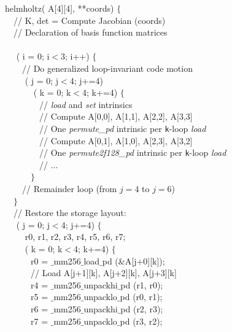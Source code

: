 \begin{algorithm}
\tiny\ttfamily
{}

\begin{multicols}{2}
 helmholtz( A[4][4],  **coords) $\lbrace$\\
~~// K, det = Compute Jacobian (coords) \\
~~// Declaration of basis function matrices \\
~~\\
~~ ( i = 0; i$<$3; i++) $\lbrace$ \\
~~~~// Do generalized loop-invariant code motion \\
~~~~ ( j = 0; j$<$4; j+=4) \\
~~~~~~ ( k = 0; k$<$4; k+=4) $\lbrace$\\
~~~~~~~~// \emph{load} and \emph{set} intrinsics \\
~~~~~~~~// Compute A[0,0], A[1,1], A[2,2], A[3,3] \\
~~~~~~~~// One \emph{permute\_pd} intrinsic per \texttt{k}-loop \emph{load}\\
~~~~~~~~// Compute A[0,1], A[1,0], A[2,3], A[3,2] \\
~~~~~~~~// One \emph{permute2f128\_pd} intrinsic per \texttt{k}-loop \emph{load}\\
~~~~~~~~// ...\\
~~~~~~$\rbrace$\\
~~~~// Remainder loop (from $j=4$ to $j=6$)\\
~~$\rbrace$\\
~~// Restore the storage layout:\\
~~ ( j = 0; j$<$4; j+=4) $\lbrace$\\
~~~~ r0, r1, r2, r3, r4, r5, r6, r7;\\
~~~~ ( k = 0; k$<$4; k+=4) $\lbrace$\\
~~~~~~r0 = $\_$mm256$\_$load$\_$pd ($\&$A[j+0][k]);\\
~~~~~~// Load A[j+1][k], A[j+2][k], A[j+3][k]\\
~~~~~~r4 = $\_$mm256$\_$unpackhi$\_$pd (r1, r0);\\
~~~~~~r5 = $\_$mm256$\_$unpacklo$\_$pd (r0, r1);\\
~~~~~~r6 = $\_$mm256$\_$unpackhi$\_$pd (r2, r3);\\
~~~~~~r7 = $\_$mm256$\_$unpacklo$\_$pd (r3, r2);\\

\end{multicols}
\end{algorithm}
